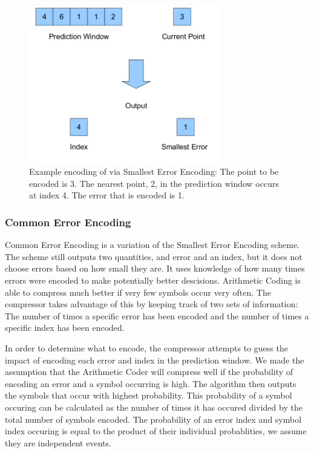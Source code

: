 \documentclass[a4paper,11pt]{report}
\begin{document}
\begin{figure}
 \center
 \includegraphics[width=0.75\textwidth]{resources/Nearest.png}
\caption{Example encoding of via Smallest Error Encoding: The point to be encoded is 3. The nearest point, 2, in the prediction window occurs at index 4. The error that is encoded is 1.}
\label{NearestDescrip}
\end{figure}

\subsubsection{Common Error Encoding}

Common Error Encoding is a variation of the Smallest Error Encoding scheme. The scheme still outputs two quantities, and error and an index, but it does not choose errors based on how small they are. It uses knowledge of how many times errors were encoded to make potentially better descisions. Arithmetic Coding is able to compress much better if very few symbols occur very often. The compressor takes advantage of this by keeping track of two sets of information: The number of times a specific error has been encoded and the number of times a specific index has been encoded. 

In order to determine what to encode, the compressor attempts to guess the impact of encoding each error and index in the prediction window. We made the assumption that the Arithmetic Coder will compress well if the probability of encoding an error and a symbol occurring is high. The algorithm then outputs the symbols that occur with highest probability. This probability of a symbol occuring can be calculated as the number of times it has occured divided by the total number of symbols encoded. The probability of an error index and symbol index occuring is equal to the product of their individual probablities, we assume they are independent events.
\end{document}
